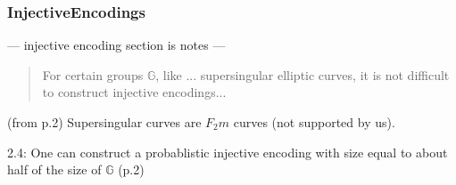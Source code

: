 \subsubsection{InjectiveEncodings}

--- injective encoding section is notes ---

\begin{quote}
    For certain groups \(\mathbb{G}\), like ... supersingular elliptic curves, it is not difficult to construct injective
	encodings...
\end{quote}

(from p.2) Supersingular curves are \(F_2m\) curves (not supported by us).

2.4: One can construct a probablistic injective encoding with size equal to about half of the size of \(\mathbb{G}\) (p.2)